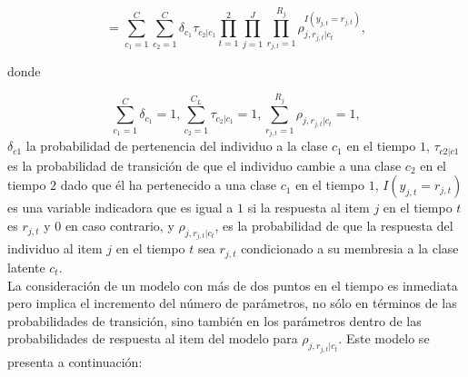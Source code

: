 	\begin{equation}
		=\sum _{ {c}_{1}=1 }^{C}{\sum _{ {c}_{2}=1 }^{C}{\delta _{c_1} \tau_{c_2|c_1} }}\prod _{ t=1 }^{ 2 }{  \prod_{ j=1 }^{J}{\prod_{ r_{j,t}=1 }^{R_j}{\rho_{j,r_{j,t}|c_t}^{I(y_{j,t}=r_{j,t})}  } }    } , \label{3.1}
	\end{equation}
	
	donde
	
	\begin{equation}
		\sum _{ c_{1} =1 }^{C}{\delta _{c_{1}} } =1, \sum_{c_{2}=1}^{C_{L}}{\tau_{c_{2} | c_{1}}}=1, \sum _{ r_{j,t}=1 }^{R_j}{\rho_{j,r_{j,t}|c_t} }  =1  ,\label{3.7}
	\end{equation}
$\delta _{c1}$ la probabilidad de pertenencia del individuo a la clase $c_1$ en el tiempo $1$, $\tau_{c2|c1}$ es la probabilidad de transici\'{o}n de que el individuo cambie a una clase $c_2$ en el tiempo $2$ dado que \'{e}l ha pertenecido a una clase $c_1$ en el tiempo $1$, $I(y_{j,t}=r_{j,t})$ es una variable indicadora que es igual a $1$ si la respuesta al item $j$ en el tiempo $t$ es  $r_{j,t}$ y $0$ en caso contrario, y $\rho_{j,r_{j,t}|c_t}$, es la probabilidad de que la respuesta del individuo al item $j$ en el tiempo $t$ sea $r_{j,t}$ condicionado a su membresia a la clase latente $c_t$.\\
	La consideraci\'{o}n de un modelo con m\'{a}s de dos puntos en el tiempo es inmediata pero implica el incremento del n\'{u}mero de par\'{a}metros, no s\'{o}lo en t\'{e}rminos de las probabilidades de transici\'{o}n, sino tambi\'{e}n en los par\'{a}metros dentro de las probabilidades de respuesta al item del modelo para $\rho_{j,r_{j,t}|c_t}$. Este modelo se presenta a continuaci\'{o}n:
	
